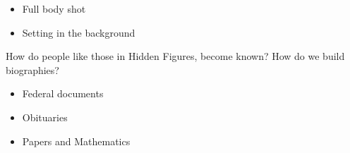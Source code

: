 \documentclass{report}
\begin{document}
\begin{description}
\begin{mdframed}
\begin{itemize}
\begin{itemize}
                        \item Full body shot
                        \item Setting in the background
                    \end{itemize}
            \end{itemize}
            How do people like those in Hidden Figures,
            become known? How do we build biographies?
            \begin{itemize}
                \item Federal documents
                \item Obituaries
                \item Papers and Mathematics
            \end{itemize}
        \end{mdframed}
\end{description}
\end{document}
